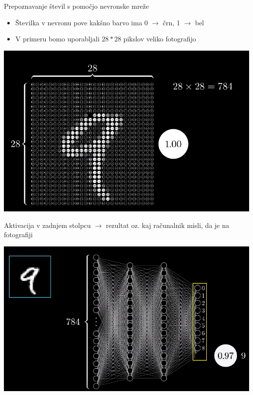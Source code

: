\documentclass{beamer}
\begin{document}
\begin{frame}{Prepoznavanje števil s pomočjo nevronske mreže}
\begin{itemize}
\item
Številka v nevronu pove kakšno barvo ima 0  $\rightarrow $ črn, 1  $\rightarrow $ bel
\item
V primeru bomo uporabljali $28*28$ pikslov veliko fotografijo
\end{itemize}
\begin{center}
\includegraphics[scale = 0.45]{photo/foto2}
\end{center}
\end{frame}

\begin{frame}{}
Aktivacija v zadnjem stolpcu $\rightarrow$ rezultat oz. kaj računalnik misli, da je na fotografiji
\begin{center}
\includegraphics[scale = 0.55]{photo/foto3}
\end{center}
\end{frame}
\end{document}
